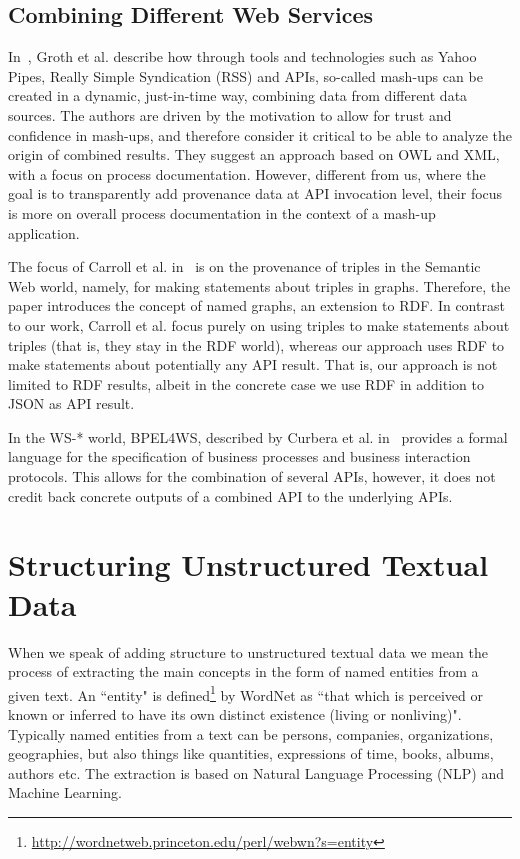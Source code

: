 \documentclass[twocolumn]{article}
\begin{document}
\subsection{Combining Different Web Services}
In~\cite{Groth:2009:MPD:1462159.1462162}, Groth et al. describe how through tools and technologies such as Yahoo Pipes, Really Simple Syndication (RSS) and APIs, so-called mash-ups can be created in a dynamic, just-in-time way, combining data from different data sources. The authors are driven by the motivation to allow for trust and confidence in mash-ups, and therefore consider it critical to be able to analyze the origin of combined results. They suggest an approach based on OWL and XML, with a focus on process documentation. However, different from us, where the goal is to transparently add provenance data at API invocation level, their focus is more on overall process documentation in the context of a mash-up application.

The focus of Carroll et al. in~\cite{carroll2005} is on the provenance of triples in the Semantic Web world, namely, for making statements about triples in graphs. Therefore, the paper introduces the concept of named graphs, an extension to RDF. In contrast to our work, Carroll et al. focus purely on using triples to make statements about triples (that is, they stay in the RDF world), whereas our approach uses RDF to make statements about potentially any API result. That is, our approach is not limited to RDF results, albeit in the concrete case we use RDF in addition to JSON as API result.
 
In the WS-* world, BPEL4WS, described by Curbera et al. in~\cite{Curbera:2003:NSW:944217.944234} provides a formal language for the specification of business processes and business interaction protocols. This allows for the combination of several APIs, however, it does not credit back concrete outputs of a combined API to the underlying APIs.

\section{Structuring Unstructured Textual Data}
When we speak of adding structure to unstructured textual data we mean the process of extracting the main concepts in the form of named entities from a given text. An ``entity" is defined\footnote{\url{http://wordnetweb.princeton.edu/perl/webwn?s=entity}} by WordNet as ``that which is perceived or known or inferred to have its own distinct existence (living or nonliving)". Typically named entities from a text can be persons, companies, organizations, geographies, but also things like quantities, expressions of time, books, albums, authors etc. The extraction is based on Natural Language Processing (NLP) and Machine Learning.
\end{document}
